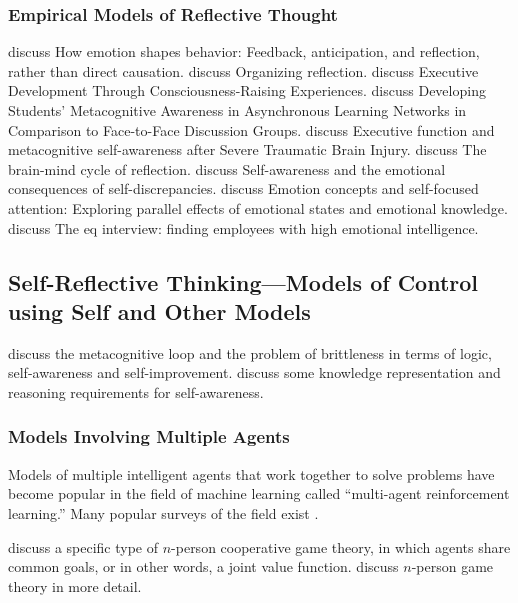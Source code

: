 \subsubsection{Empirical Models of Reflective Thought}


\cite{baumeister:2007} discuss How emotion shapes behavior: Feedback, anticipation, and reflection, rather than direct causation.
\cite{vince:2002} discuss Organizing reflection.
\cite{mirvis:2008} discuss Executive Development Through Consciousness-Raising Experiences.
\cite{michalsky:2007} discuss Developing Students' Metacognitive Awareness in Asynchronous Learning Networks in Comparison to Face-to-Face Discussion Groups.
\cite{bivona:2008} discuss Executive function and metacognitive self-awareness after Severe Traumatic Brain Injury.
\cite{irannejad:2001} discuss The brain-mind cycle of reflection.
\cite{phillips:2005} discuss Self-awareness and the emotional consequences of self-discrepancies.
\cite{silvia:2006} discuss Emotion concepts and self-focused attention: Exploring parallel effects of emotional states and emotional knowledge.
\cite{lynn:2008} discuss The eq interview: finding employees with high emotional intelligence.


\subsection{Self-Reflective Thinking---Models of Control using Self and Other Models}

\cite{anderson:2005} discuss the metacognitive loop and the problem of brittleness in terms of logic, self-awareness and self-improvement.
\cite{schubert:2005} discuss some knowledge representation and reasoning requirements for self-awareness.

\subsubsection{Models Involving Multiple Agents}

Models of multiple intelligent agents that work together to solve problems have become popular in the field of machine learning called ``multi-agent reinforcement learning.''
Many popular surveys of the field exist \cite[]{wei:1995} \cite[]{sen:1999} \cite[]{stone:2000} \cite[]{shoham:2004} \cite[]{yang:2004} \cite[]{panait:2005}.

\cite{boutilier:1996} discuss a specific type of $n$-person cooperative game theory, in which agents share common goals, or in other words, a joint value function.
\cite{rapoport:2001} discuss $n$-person game theory in more detail.


